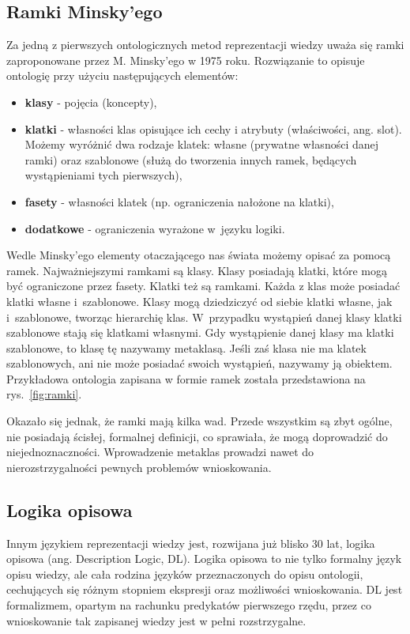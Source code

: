 \subsection*{Ramki Minsky'ego}
Za jedną z pierwszych ontologicznych metod reprezentacji wiedzy uważa się ramki zaproponowane przez M. Minsky'ego w 1975 roku. Rozwiązanie to opisuje ontologię przy użyciu 
następujących elementów\cite{goczyla}:
\begin{itemize}
\item { \bf klasy } - pojęcia (koncepty),
\item { \bf klatki } - własności klas opisujące ich cechy i atrybuty (właściwości, ang. slot). Możemy wyróżnić dwa rodzaje klatek: własne (prywatne własności danej ramki) 
oraz szablonowe (służą do tworzenia innych ramek, będących wystąpieniami tych pierwszych), 
\item { \bf fasety } - własności klatek (np. ograniczenia nałożone na klatki),
\item { \bf dodatkowe } -  ograniczenia wyrażone w~języku logiki.
\end{itemize}
Wedle Minsky'ego elementy otaczającego nas świata możemy opisać za pomocą ramek. Najważniejszymi ramkami są klasy. Klasy posiadają klatki, które mogą być  ograniczone przez fasety.
 Klatki też są ramkami. Każda z klas może posiadać klatki własne i~szablonowe. Klasy mogą dziedziczyć od siebie klatki własne, jak i~szablonowe, tworząc hierarchię klas. W~przypadku 
wystąpień danej klasy klatki szablonowe stają się klatkami własnymi. Gdy wystąpienie danej klasy ma klatki szablonowe, to klasę tę nazywamy metaklasą. Jeśli zaś klasa 
nie ma klatek szablonowych, ani nie może posiadać swoich wystąpień, nazywamy ją obiektem. Przykładowa ontologia zapisana w formie ramek została przedstawiona na rys.~\ref{fig:ramki}.


Okazało się jednak, że ramki mają kilka wad. Przede wszystkim są zbyt ogólne,  nie posiadają ścisłej, formalnej definicji, co sprawiała, że mogą doprowadzić do niejednoznaczności.
 Wprowadzenie metaklas prowadzi nawet do nierozstrzygalności pewnych problemów wnioskowania. 

\subsection*{Logika opisowa}

Innym językiem reprezentacji wiedzy jest, rozwijana już blisko 30 lat, logika opisowa (ang. Description Logic, DL). Logika opisowa to nie tylko formalny język opisu wiedzy, 
ale cała rodzina języków przeznaczonych do opisu ontologii, cechujących się różnym stopniem ekspresji oraz możliwości wnioskowania. DL jest formalizmem, opartym na rachunku predykatów 
pierwszego rzędu, przez co wnioskowanie tak zapisanej wiedzy jest w pełni rozstrzygalne. 


